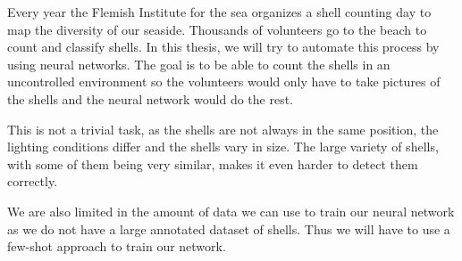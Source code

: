 Every year the Flemish Institute for the sea organizes a shell counting day to map the diversity of our seaside. 
Thousands of volunteers go to the beach to count and classify shells. 
In this thesis, we will try to automate this process by using neural networks.
The goal is to be able to count the shells in an uncontrolled environment so the volunteers would only have to take pictures of the shells and the neural network would do the rest.

This is not a trivial task, as the shells are not always in the same position, the lighting conditions differ and the shells vary in size.
The large variety of shells, with some of them being very similar, makes it even harder to detect them correctly.

We are also limited in the amount of data we can use to train our neural network as we do not have a large annotated dataset of shells. Thus we will have to use a few-shot approach to train our network.